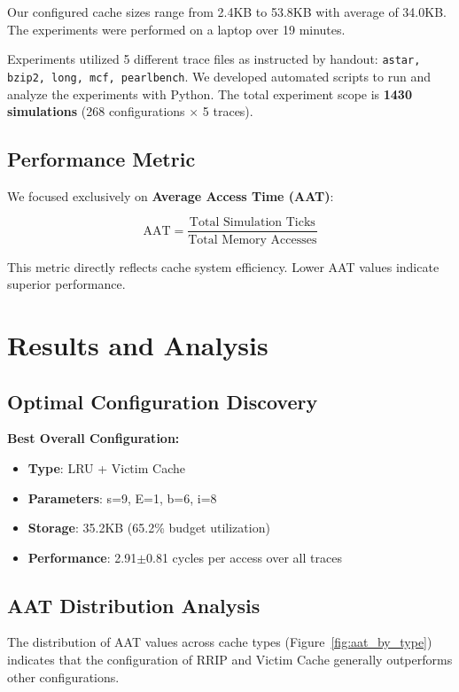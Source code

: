 \documentclass[sigconf,nonacm,natbib=false]{acmart}
\begin{document}
Our configured cache sizes range from 2.4KB to 53.8KB with average of 34.0KB. The experiments were performed on a laptop over 19 minutes.

Experiments utilized 5 different trace files as instructed by handout: \texttt{astar, bzip2, long, mcf, pearlbench}. We developed automated scripts to run and analyze the experiments with Python. The total experiment scope is \textbf{1430 simulations} (268 configurations $\times$ 5 traces).

\subsection{Performance Metric}

We focused exclusively on \textbf{Average Access Time (AAT)}:

\begin{equation}
\text{AAT} = \frac{\text{Total Simulation Ticks}}{\text{Total Memory Accesses}}
\end{equation}

This metric directly reflects cache system efficiency. Lower AAT values indicate superior performance.

\section{Results and Analysis}

\subsection{Optimal Configuration Discovery}

\textbf{Best Overall Configuration:}
\begin{itemize}
\item \textbf{Type}: LRU + Victim Cache
\item \textbf{Parameters}: s=9, E=1, b=6, i=8
\item \textbf{Storage}: 35.2KB (65.2\% budget utilization)
\item \textbf{Performance}: 2.91$\pm$0.81 cycles per access over all traces
\end{itemize}

\subsection{AAT Distribution Analysis}

The distribution of AAT values across cache types (Figure~\ref{fig:aat_by_type}) indicates that the configuration of RRIP and Victim Cache generally outperforms other configurations.
\end{document}
